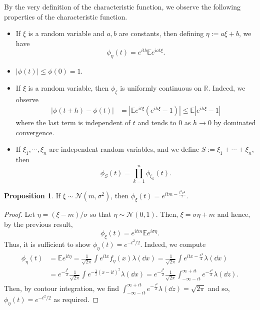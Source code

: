\documentclass[]{article}
\theoremstyle{definition}
\theoremstyle{definition}
\newtheorem{proposition}{Proposition}[section]
\begin{document}
By the very definition of the characteristic function, we observe the following 
properties of the characteristic function. 
\begin{itemize}
  \item If \(\xi\) is a random variable and \(a, b\) are constants, then 
    defining \(\eta := a\xi + b\), we have
  \[\phi_{\eta}(t) = e^{itb} \mathbb{E}e^{iat\xi}.\]
  \item \(|\phi(t)| \le \phi(0) = 1\).
  \item If \(\xi\) is a random variable, then \(\phi_\xi\) is uniformly 
    continuous on \(\mathbb{R}\). Indeed, we observe 
    \[\begin{split}
      |\phi(t + h) - \phi(t)| & = |\mathbb{E}e^{it\xi}(e^{ih\xi} - 1)|
        \le \mathbb{E}|e^{ih\xi} - 1|
    \end{split}\]
    where the last term is independent of \(t\) and tends to 0 as 
    \(h \to 0\) by dominated convergence. 
  \item If \(\xi_1, \cdots, \xi_n\) are independent random variables, and we 
    define \(S := \xi_1 + \cdots + \xi_n\), then 
    \[\phi_S(t) = \prod_{k = 1}^n \phi_{\xi_k}(t).\]
\end{itemize}

\begin{proposition}
  If \(\xi \sim \mathcal{N}(m, \sigma^2)\), then 
  \(\phi_\xi(t) = e^{itm - \frac{t^2 \sigma^2}{2}}\).
\end{proposition}
\begin{proof}
  Let \(\eta = (\xi - m)/ \sigma\) so that \(\eta \sim \mathcal{N}(0, 1)\). Then, 
  \(\xi = \sigma \eta + m\) and hence, by the previous result, 
  \[\phi_\xi(t) = e^{itm}\mathbb{E}e^{i\sigma \eta}.\] 
  Thus, it is sufficient to show \(\phi_\eta(t) = e^{-t^2/2}\). Indeed, 
  we compute 
  \[\begin{split}
    \phi_\eta(t) & = \mathbb{E}e^{it\eta} = 
    \frac{1}{\sqrt{2\pi}} \int e^{itx} f_\eta(x) \lambda(\dd x)
    = \frac{1}{\sqrt{2\pi}} \int e^{itx - \frac{x^2}{2}} \lambda(\dd x)\\
    & = e^{-\frac{t^2}{2}}\frac{1}{\sqrt{2\pi}} \int e^{-\frac{1}{2}(x - it)^2} \lambda(\dd x)
    = e^{-\frac{t^2}{2}}\frac{1}{\sqrt{2\pi}} \int_{-\infty - it}^{\infty + it} 
      e^{-\frac{z^2}{2}} \lambda(\dd z).
  \end{split}\]
  Then, by contour integration, we find \(\int_{-\infty - it}^{\infty + it} 
  e^{-\frac{z^2}{2}} \lambda(\dd z) = \sqrt{2\pi}\) and so, \(\phi_\eta(t) = e^{-t^2 / 2}\) 
  as required.
\end{proof}
\end{document}
